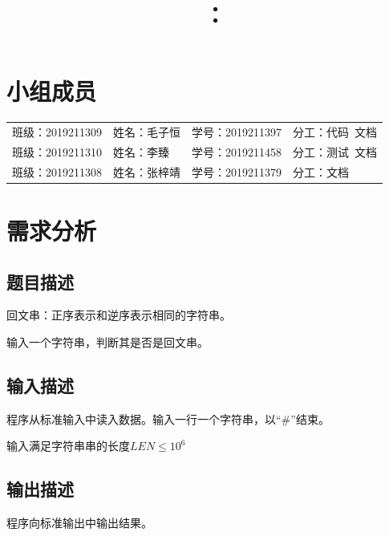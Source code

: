 \documentclass{article}
\title{\hmwkClass\ ：\hmwkTitle}
\author{\hmwkAuthorName}
\begin{document}
\maketitle  

\section*{小组成员}

\setlength{\tabcolsep}{9mm}
{
    \begin{table}[htbp]
        \centering
        \begin{tabular}{llll}
            班级：2019211309 & 姓名：毛子恒 & 学号：2019211397 & 分工：代码\ 文档 \\
            
            班级：2019211310 & 姓名：李臻   & 学号：2019211458 & 分工：测试\ 文档 \\
            
            班级：2019211308 & 姓名：张梓靖 & 学号：2019211379 & 分工：文档       \\
        \end{tabular}
    \end{table}
}

\tableofcontents
\newpage

\section{需求分析}

\subsection{题目描述}

回文串：正序表示和逆序表示相同的字符串。

输入一个字符串，判断其是否是回文串。

\subsection{输入描述}

程序从标准输入中读入数据。输入一行一个字符串，以“\#”结束。

输入满足字符串串的长度$LEN\leq 10^6$

\subsection{输出描述}

程序向标准输出中输出结果。
\end{document}
